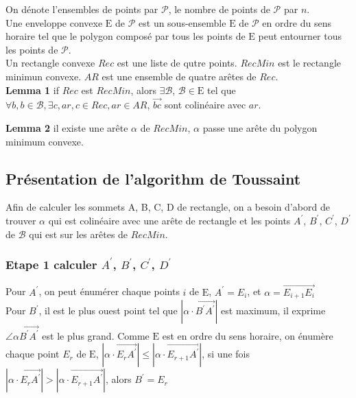 \documentclass[14px]{article}
\begin{document}
On dénote l'ensembles de points par $\mathcal{P}$, le nombre de points de $\mathcal{P}$ par $n$.\\
Une enveloppe convexe $\mathrm{E}$ de $\mathcal{P}$ est un sous-ensemble $\mathrm{E}$ de $\mathcal{P}$ en ordre du sens horaire tel que le polygon composé par tous les points de $\mathrm{E}$ peut entourner tous les points de $\mathcal{P}$.\\
Un rectangle convexe $Rec$ est une liste de qutre points. $RecMin$ est le rectangle minimun convexe. $AR$ est une ensemble de quatre arêtes de $Rec$.\\

\textbf{Lemma 1} if $Rec$ est $RecMin$, alors $\exists \mathcal{B}$, $\mathcal{B} \in \mathrm{E}$ tel que $\forall b, b \in \mathcal{B},\exists c, ar, c \in Rec, ar\in AR$, $\overrightarrow{bc}$ sont colinéaire avec $ar$.

\textbf{Lemma 2} il existe une arête $\alpha$ de $RecMin$, $\alpha$ passe une arête du polygon minimum convexe.


\subsection{Présentation de l'algorithm de Toussaint}
Afin de calculer les sommets A, B, C, D de rectangle, on a besoin d'abord de trouver $\alpha$ qui est colinéaire avec une arête de rectangle et les points $A^{\prime}$,  $B^{\prime}$, $C^{\prime}$, $D^{\prime}$ de $\mathcal{B}$ qui est sur les arêtes de $RecMin$.

\subsubsection{Etape 1 calculer $A^{\prime}$,  $B^{\prime}$, $C^{\prime}$, $D^{\prime}$}
Pour $A^{\prime}$, on peut énumérer chaque points $i$ de $\mathrm{E}$, $A^{\prime} = E_{i}$,
et $\alpha = \overrightarrow{E_{i+1}E_{i}}$ \\

Pour $B^{\prime}$, il est le plus ouest point tel que $|\alpha \cdot \overrightarrow{B^{\prime}A^{\prime}}|$ est maximum, il exprime $\angle \alpha\overrightarrow{B^{\prime}A^{\prime}}$ est le plus grand. Comme $\mathrm{E}$ est en ordre du sens horaire, on énumère chaque point $E_{r}$ de $\mathrm{E}$, $|\alpha\cdot\overrightarrow{E_{r}A^{\prime}}| \leqslant |\alpha\cdot\overrightarrow{E_{r+1}A^{\prime}}|$, si une fois $|\alpha\cdot\overrightarrow{E_{r}A^{\prime}}| > |\alpha\cdot\overrightarrow{E_{r+1}A^{\prime}}|$, alors $B^{\prime} = E_{r}$\\
\end{document}
